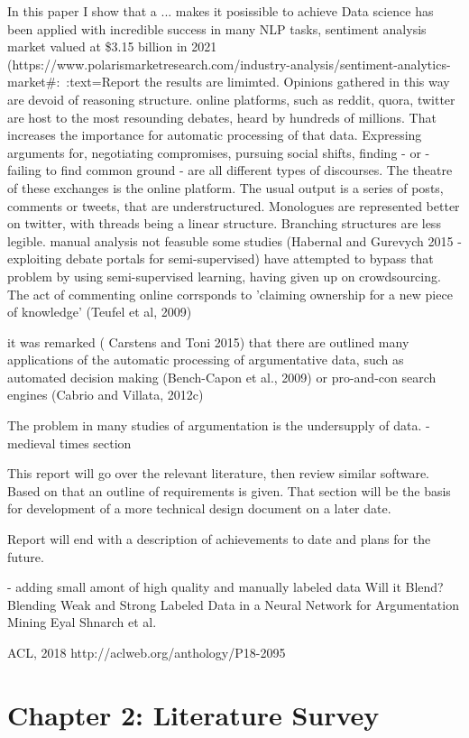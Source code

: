 \documentclass{article}
\begin{document}
In this paper I show that a ... makes it posissible to achieve
Data science has been applied with incredible success in many NLP tasks, sentiment analysis market valued at \$3.15 billion in 2021 (https://www.polarismarketresearch.com/industry-analysis/sentiment-analytics-market#:~:text=Report%
the results are limimted. Opinions gathered in this way are devoid of reasoning structure.
online platforms, such as reddit, quora, twitter are host to the most resounding debates, heard by hundreds of millions. That increases the importance for automatic processing of that data.
Expressing arguments for, negotiating compromises, pursuing social shifts, finding - or - failing to find common ground - are all different types of discourses. The theatre of these exchanges is the online platform.
The usual output is a series of posts, comments or tweets, that are understructured. Monologues are represented better on twitter, with threads being a linear structure. Branching structures are less legible.
manual analysis not feasuble some studies (Habernal and Gurevych 2015 - exploiting debate portals for semi-supervised) have attempted to bypass that problem by using semi-supervised learning, having given up on crowdsourcing.
The act of commenting online corrsponds to 'claiming ownership for a new piece of knowledge' (Teufel et al, 2009)

it was remarked ( Carstens and Toni 2015) that there are outlined many applications of the automatic processing of argumentative data, such as automated decision making (Bench-Capon et al., 2009) or pro-and-con search engines (Cabrio and Villata, 2012c)

The problem in many studies of argumentation is the undersupply of data.
- medieval times section

This report will go over the relevant literature, then review similar software. Based on that an outline of requirements is given. That section will be the basis for development of a more technical design document on a later date.

Report will end with a description of achievements to date and plans for the future.

- adding small amont of high quality and manually labeled data
Will it Blend? Blending Weak and Strong Labeled Data in a Neural Network for Argumentation Mining
Eyal Shnarch et al.

ACL, 2018
http://aclweb.org/anthology/P18-2095


\section{Chapter 2: Literature Survey}
\end{document}
